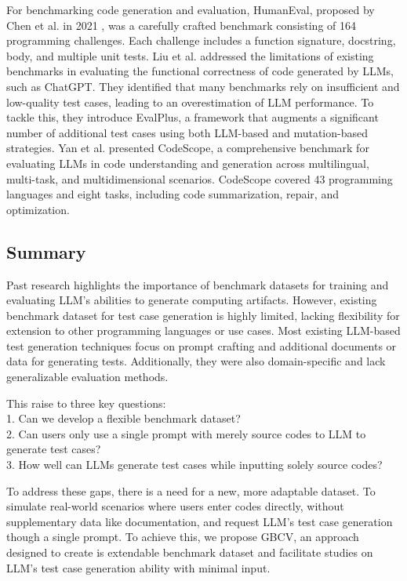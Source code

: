For benchmarking code generation and evaluation, HumanEval, proposed by Chen et al. in 2021 \cite{markichengchen_2021_evaluating}, was a carefully crafted benchmark consisting of 164 programming challenges. Each challenge includes a function signature, docstring, body, and multiple unit tests. Liu et al. \cite{liu_2023_is} addressed the limitations of existing benchmarks in evaluating the functional correctness of code generated by LLMs, such as ChatGPT. They identified that many benchmarks rely on insufficient and low-quality test cases, leading to an overestimation of LLM performance. To tackle this, they introduce EvalPlus, a framework that augments a significant number of additional test cases using both LLM-based and mutation-based strategies. Yan et al. \cite{yan_2023_codescope} presented CodeScope, a comprehensive benchmark for evaluating LLMs in code understanding and generation across multilingual, multi-task, and multidimensional scenarios. CodeScope covered 43 programming languages and eight tasks, including code summarization, repair, and optimization.

\subsection{Summary}

Past research highlights the importance of benchmark datasets for training and evaluating LLM’s abilities to generate computing artifacts. However, existing benchmark dataset for test case generation is highly limited, lacking flexibility for extension to other programming languages or use cases. Most existing LLM-based test generation techniques focus on prompt crafting and additional documents or data for generating tests. Additionally, they were also domain-specific and lack generalizable evaluation methods.

This raise to three key questions: \\
1. Can we develop a flexible benchmark dataset? \\
2. Can users only use a single prompt with merely source codes to LLM to generate test cases? \\
3. How well can LLMs generate test cases while inputting solely source codes?

To address these gaps, there is a need for a new, more adaptable dataset. To simulate real-world scenarios where users enter codes directly, without supplementary data like documentation, and request LLM’s test case generation though a single prompt. To achieve this, we propose GBCV, an approach designed to create is extendable benchmark dataset and facilitate studies on LLM’s test case generation ability with minimal input.